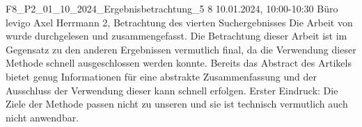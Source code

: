 \fieldnote
{F8\_P2\_01\_10\_2024\_Ergebnisbetrachtung\_5}
{8}
{10.01.2024, 10:00-10:30}
{Büro levigo}
{Axel Herrmann}
{2, Betrachtung des vierten Suchergebnisses}
{
  Die Arbeit von  wurde durchgelesen und zusammengefasst.
}
{
  Die Betrachtung dieser Arbeit ist im Gegensatz zu den anderen Ergebnissen vermutlich final, da die Verwendung dieser Methode schnell ausgeschlossen werden konnte.
}
{
  Bereits das Abstract des Artikels bietet genug Informationen für eine abstrakte Zusammenfassung und der Ausschluss der Verwendung dieser kann schnell erfolgen.
}
{}
{
  Erster Eindruck: Die Ziele der Methode passen nicht zu unseren und sie ist technisch vermutlich auch nicht anwendbar.
}
